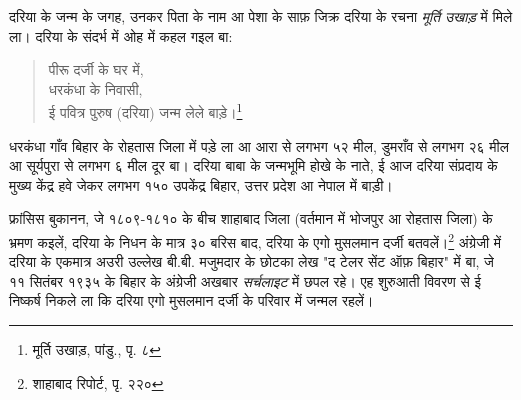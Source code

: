 दरिया के जन्म के जगह, उनकर पिता के नाम आ पेशा के साफ़ जिक्र दरिया के रचना \textit{मूर्ति उखाड़} में मिले ला। दरिया के संदर्भ में ओह में कहल गइल बा:

\begin{quote}
पीरू दर्जी के घर में,\\
धरकंधा के निवासी,\\
ई पवित्र पुरुष (दरिया) जन्म लेले बाड़े।\footnote{मूर्ति उखाड़, पांडु., पृ. ८}
\end{quote}

धरकंधा गाँव बिहार के रोहतास जिला में पड़े ला आ आरा से लगभग ५२ मील, डुमराँव से लगभग २६ मील आ सूर्यपुरा से लगभग ६ मील दूर बा। दरिया बाबा के जन्मभूमि होखे के नाते, ई आज दरिया संप्रदाय के मुख्य केंद्र हवे जेकर लगभग १५० उपकेंद्र बिहार, उत्तर प्रदेश आ नेपाल में बाड़ी।

फ्रांसिस बुकानन, जे १८०९-१८१० के बीच शाहाबाद जिला (वर्तमान में भोजपुर आ रोहतास जिला) के भ्रमण कइलें, दरिया के निधन के मात्र ३० बरिस बाद, दरिया के एगो मुसलमान दर्जी बतवलें।\footnote{शाहाबाद रिपोर्ट, पृ. २२०} अंग्रेजी में दरिया के एकमात्र अउरी उल्लेख बी.बी. मजुमदार के छोटका लेख "द टेलर सेंट ऑफ़ बिहार" में बा, जे ११ सितंबर १९३५ के बिहार के अंग्रेजी अखबार \textit{सर्चलाइट} में छपल रहे। एह शुरुआती विवरण से ई निष्कर्ष निकले ला कि दरिया एगो मुसलमान दर्जी के परिवार में जन्मल रहलें।

